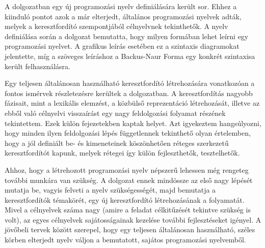 

A dolgozatban egy új programozási nyelv definiálására került sor. Ehhez a kiinduló pontot azok a már elterjedt, általános programozási nyelvek adták, melyek a keresztfordító szempontjából célnyelvnek tekinthetők. A nyelv definiálása során a dolgozat bemutatta, hogy milyen formában lehet leírni egy programozási nyelvet. A grafikus leírás esetében ez a szintaxis diagramokat jelentette, míg a szöveges leíráshoz a Backus-Naur Forma egy konkrét szintaxisa került felhasználásra.

Egy teljesen általánosan használható keresztfordító létrehozására vonatkozóan a fontos ismérvek részletezésre kerültek a dolgozatban. A keresztfordítás nagyobb fázisait, mint a lexikális elemzést, a közbülső reprezentáció létrehozását, illetve az ebből való célnyelvi visszaírást egy nagy feldolgozási folyamat részének tekintettem. Ezek külön fejezetekben kaptak helyet. Azt igyekeztem hangsúlyozni, hogy minden ilyen feldolgozási lépés függetlennek tekinthető olyan értelemben, hogy a jól definiált be- és kimeneteinek köszönhetően réteges szerkezetű keresztfordítót kapunk, melyek rétegei így külön fejleszthetők, tesztelhetők.

Ahhoz, hogy a létrehozott programozási nyelv népszerű lehessen még rengeteg további munkára van szükség. A dolgozat ennek mindössze az első nagy lépését mutatja be, vagyis felveti a nyelv szükségességét, majd bemutatja a keresztfordítók témakörét, egy új keresztfordító létrehozásának a folyamatát. Mivel a célnyelvek száma nagy (amire a feladat célkitűzését tekintve szükség is volt), az egyes célnyelvek sajátosságainak kezelése további fejlesztéseket igényel. A jövőbeli tervek között szerepel, hogy egy teljesen általánosan használható, széles körben elterjedt nyelv váljon a bemutatott, sajátos programozási nyelvemből.
